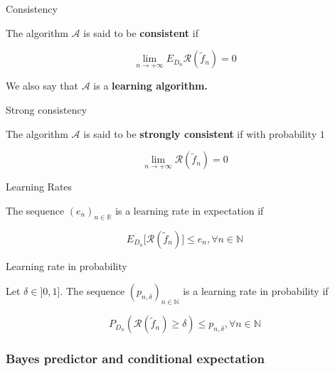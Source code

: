 \documentclass[
10pt, %
a4paper, %
oneside, %
headinclude,footinclude, %
BCOR5mm, %
]{scrartcl}
\begin{document}
\begin{definition}{Consistency}

    The algorithm $\mathcal{A} $ is said to be \textbf{{consistent}}  if 

    \begin{equation*}
	\lim_{n\rightarrow +\infty} E_{D_n} \mathcal{R} ( \tilde{f}_n)=0 
    \end{equation*}
\end{definition}

    We also say that $ \mathcal{A} $ is a \textbf{{learning algorithm.}} 

\begin{definition}{Strong consistency}

    The algorithm $\mathcal{A} $ is said to be \textbf{{strongly consistent}}  if with probability $1$

    \begin{equation*}
	\lim_{n\rightarrow +\infty} \mathcal{R} ( \tilde{f}_n)=0 
    \end{equation*}


\end{definition}

\begin{definition}{Learning Rates}

    The sequence $(e_n)_{n \in \mathbb{R} } $ is a learning rate in expectation if

    \begin{equation*}
	E_{D_n} \big[\mathcal{R} ( \tilde{f}_n)\big]\leq e_n, \forall n\in \mathbb{N} 
    \end{equation*}
    
\end{definition}

\begin{definition}{Learning rate in probability}

    Let $\delta \in ]0, 1]$.  The  sequence $(p_{n, \delta})_{n\in \mathbb{N} }$ is a learning rate in probability if

    \begin{equation*}
	P_{D_n}( \mathcal{R} ( \tilde{f}_n)\geq \delta)\leq p_{n,\delta}, \forall n\in \mathbb{N} 
    \end{equation*}
\end{definition}


    \subsubsection{\large\color{Periwinkle}Bayes predictor and conditional expectation}
\end{document}
